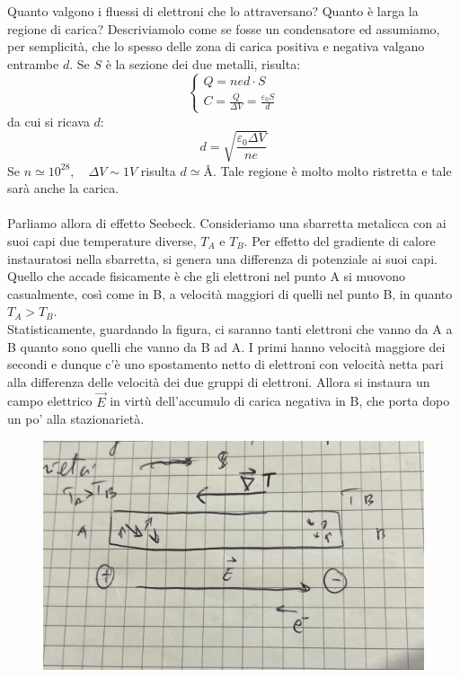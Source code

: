 \documentclass{book}
\begin{document}
        Quanto valgono i fluessi di elettroni che lo attraversano? Quanto è larga la regione di carica? Descriviamolo come se fosse un condensatore ed assumiamo, per semplicità, che lo spesso delle zona di carica positiva e negativa valgano entrambe $d$. Se $S$ è la sezione dei due metalli, risulta:
        $$\begin{cases} 
            Q = ned \cdot S \\
            C = \displaystyle \frac{Q}{\Delta V} = \frac{\varepsilon_{0}S}{d}
        \end{cases}$$
        da cui si ricava $d$:
        $$d = \sqrt{\frac{\varepsilon_{0}\Delta V}{ne}}$$
        Se $n \simeq 10^{28}, \quad \Delta V \sim 1V$ risulta $d \simeq$\si{\angstrom}. Tale regione è molto molto ristretta e tale sarà anche la carica.
        \paragraph{}
            Parliamo allora di effetto Seebeck. Consideriamo una sbarretta metalicca con ai suoi capi due temperature diverse, $T_{A}$ e $T_{B}$. Per effetto del gradiente di calore instauratosi nella sbarretta, si genera una differenza di potenziale ai suoi capi.\\
            Quello che accade fisicamente è che gli elettroni nel punto A si muovono casualmente, così come in B, a velocità maggiori di quelli nel punto B, in quanto $T_{A}>T_{B}$.\\
            Statisticamente, guardando la figura, ci saranno tanti elettroni che vanno da A a B quanto sono quelli che vanno da B ad A. I primi hanno velocità maggiore dei secondi e dunque c'è uno spostamento netto di elettroni con velocità netta pari alla differenza delle velocità dei due gruppi di elettroni. Allora si instaura un campo elettrico $\vec{E}$ in virtù dell'accumulo di carica negativa in B, che porta dopo un po' alla stazionarietà.
            \begin{figure}[h!]
                \centering
                \includegraphics[width=0.5\linewidth]{img/asset1.png}
            \end{figure}
\end{document}
